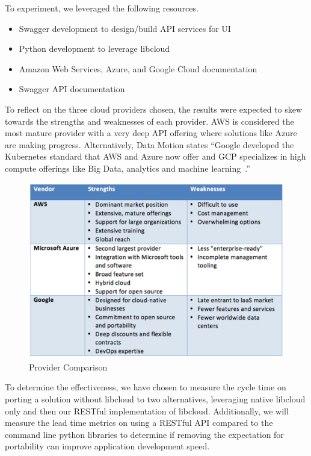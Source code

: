 To experiment, we leveraged the following resources.

\begin{itemize}

\item Swagger development to design/build API services for UI
\item Python development to leverage libcloud
\item Amazon Web Services, Azure, and Google Cloud documentation
\item Swagger API documentation
 
\end{itemize}


To reflect on the three cloud providers chosen, the results were expected to
skew towards the strengths and weaknesses of each provider. AWS is considered
the most mature provider with a very deep API offering where solutions like
Azure are making progress. Alternatively, Data Motion states ``Google developed
the Kubernetes standard that AWS and Azure now offer and GCP specializes in
high compute offerings like Big Data, analytics and machine
learning~\cite{hid-sp18-518-DataMotion}.''

\begin{figure}[!ht]
  \centering
  \includegraphics[width=\columnwidth]{images/aws-azure-google.png}
  \caption{Provider Comparison}\label{F:comparison}
\end{figure}

To determine the effectiveness, we have chosen to measure the cycle time on
porting a solution without libcloud to two alternatives, leveraging native
libcloud only and then our RESTful implementation of libcloud. Additionally, we
will measure the lead time metrics on using a RESTful API compared to the
command line python libraries to determine if removing the expectation for
portability can improve application development speed.

